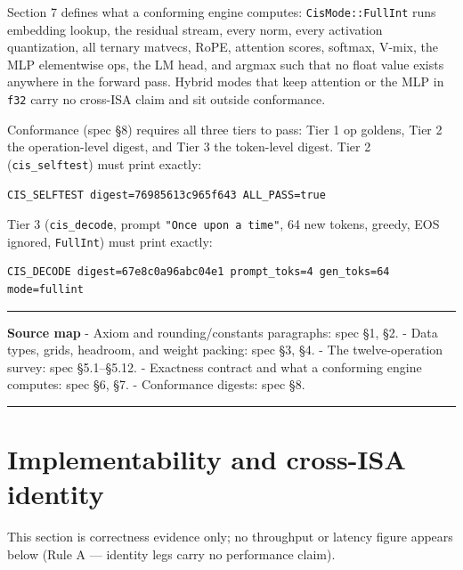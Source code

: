 \documentclass[11pt]{article}
\begin{document}
Section 7 defines what a conforming engine computes: \texttt{CisMode::FullInt} runs embedding lookup, the
residual stream, every norm, every activation quantization, all ternary matvecs, RoPE, attention
scores, softmax, V-mix, the MLP elementwise ops, the LM head, and argmax such that no float value
exists anywhere in the forward pass. Hybrid modes that keep attention or the MLP in \texttt{f32} carry no
cross-ISA claim and sit outside conformance.

Conformance (spec §8) requires all three tiers to pass: Tier 1 op goldens, Tier 2 the operation-level
digest, and Tier 3 the token-level digest. Tier 2 (\texttt{cis\_selftest}) must print exactly:

\begin{Verbatim}[breaklines=true,breakanywhere=true,fontsize=\small]
CIS_SELFTEST digest=76985613c965f643 ALL_PASS=true
\end{Verbatim}

Tier 3 (\texttt{cis\_decode}, prompt \texttt{"Once\ upon\ a\ time"}, 64 new tokens, greedy, EOS ignored, \texttt{FullInt}) must print
exactly:

\begin{Verbatim}[breaklines=true,breakanywhere=true,fontsize=\small]
CIS_DECODE digest=67e8c0a96abc04e1 prompt_toks=4 gen_toks=64 mode=fullint
\end{Verbatim}

\begin{center}\rule{0.5\linewidth}{0.5pt}\end{center}

\textbf{Source map}
- Axiom and rounding/constants paragraphs: spec §1, §2.
- Data types, grids, headroom, and weight packing: spec §3, §4.
- The twelve-operation survey: spec §5.1--§5.12.
- Exactness contract and what a conforming engine computes: spec §6, §7.
- Conformance digests: spec §8.

\begin{center}\rule{0.5\linewidth}{0.5pt}\end{center}

\section{Implementability and cross-ISA identity}\label{implementability-and-cross-isa-identity}

This section is correctness evidence only; no throughput or latency figure appears below
(Rule A --- identity legs carry no performance claim).
\end{document}
